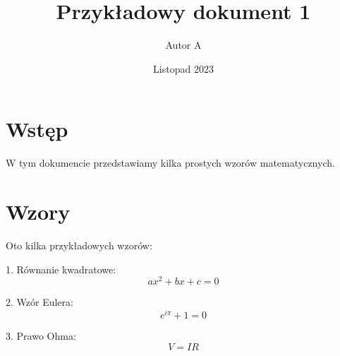 \documentclass{article}
\title{Przykładowy dokument 1}
\author{Autor A}
\date{Listopad 2023}
\begin{document}
\maketitle

\section{Wstęp}

W tym dokumencie przedstawiamy kilka prostych wzorów matematycznych.

\section{Wzory}

Oto kilka przykładowych wzorów:

1. Równanie kwadratowe:
\[ ax^2 + bx + c = 0 \]

2. Wzór Eulera:
\[ e^{i\pi} + 1 = 0 \]

3. Prawo Ohma:
\[ V = IR \]
\end{document}
